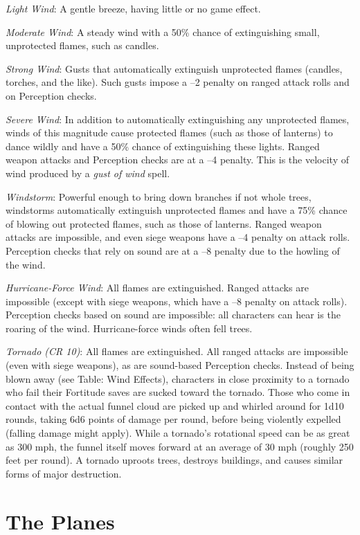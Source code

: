 \textit{Light Wind}: A gentle breeze, having little or no game effect.
				
\textit{Moderate Wind}: A steady wind with a 50\% chance of extinguishing small, unprotected flames, such as candles.
				
\textit{Strong Wind}: Gusts that automatically extinguish unprotected flames (candles, torches, and the like). Such gusts impose a --2 penalty on ranged attack rolls and on Perception checks.
				
\textit{Severe Wind}: In addition to automatically extinguishing any unprotected flames, winds of this magnitude cause protected flames (such as those of lanterns) to dance wildly and have a 50\% chance of extinguishing these lights. Ranged weapon attacks and Perception checks are at a --4 penalty. This is the velocity of wind produced by a \textit{gust of wind }spell.
				
\textit{Windstorm}: Powerful enough to bring down branches if not whole trees, windstorms automatically extinguish unprotected flames and have a 75\% chance of blowing out protected flames, such as those of lanterns. Ranged weapon attacks are impossible, and even siege weapons have a --4 penalty on attack rolls. Perception checks that rely on sound are at a --8 penalty due to the howling of the wind. 
				
\textit{Hurricane-Force Wind}: All flames are extinguished. Ranged attacks are impossible (except with siege weapons, which have a --8 penalty on attack rolls). Perception checks based on sound are impossible: all characters can hear is the roaring of the wind. Hurricane-force winds often fell trees.
				
\textit{Tornado (CR 10)}: All flames are extinguished. All ranged attacks are impossible (even with siege weapons), as are sound-based Perception checks. Instead of being blown away (see Table: Wind Effects), characters in close proximity to a tornado who fail their Fortitude saves are sucked toward the tornado. Those who come in contact with the actual funnel cloud are picked up and whirled around for 1d10 rounds, taking 6d6 points of damage per round, before being violently expelled (falling damage might apply). While a tornado's rotational speed can be as great as 300 mph, the funnel itself moves forward at an average of 30 mph (roughly 250 feet per round). A tornado uproots trees, destroys buildings, and causes similar forms of major destruction.
				
\section{The Planes}

